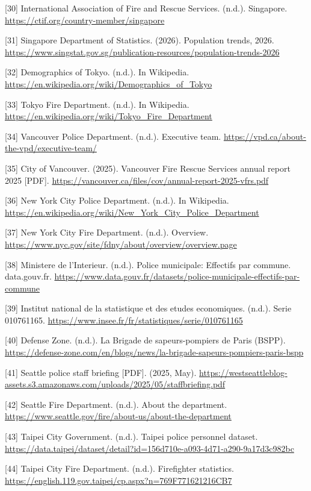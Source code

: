 \documentclass[11pt,letterpaper]{article}
\begin{document}
[30] International Association of Fire and Rescue Services. (n.d.). Singapore. \url{https://ctif.org/country-member/singapore}


[31] Singapore Department of Statistics. (2026). Population trends, 2026. \url{https://www.singstat.gov.sg/publication-resources/population-trends-2026}


[32] Demographics of Tokyo. (n.d.). In Wikipedia. \url{https://en.wikipedia.org/wiki/Demographics_of_Tokyo}


[33] Tokyo Fire Department. (n.d.). In Wikipedia. \url{https://en.wikipedia.org/wiki/Tokyo_Fire_Department}


[34] Vancouver Police Department. (n.d.). Executive team. \url{https://vpd.ca/about-the-vpd/executive-team/}


[35] City of Vancouver. (2025). Vancouver Fire Rescue Services annual report 2025 [PDF]. 
\url{https://vancouver.ca/files/cov/annual-report-2025-vfrs.pdf}


[36] New York City Police Department. (n.d.). In Wikipedia. \url{https://en.wikipedia.org/wiki/New_York_City_Police_Department}


[37] New York City Fire Department. (n.d.). Overview. \url{https://www.nyc.gov/site/fdny/about/overview/overview.page}


[38] Ministere de l'Interieur. (n.d.). Police municipale: Effectifs par commune. data.gouv.fr. 
\url{https://www.data.gouv.fr/datasets/police-municipale-effectifs-par-commune}


[39] Institut national de la statistique et des etudes economiques. (n.d.). Serie 010761165. \url{https://www.insee.fr/fr/statistiques/serie/010761165}


[40] Defense Zone. (n.d.). La Brigade de sapeurs-pompiers de Paris (BSPP). \url{https://defense-zone.com/en/blogs/news/la-brigade-sapeurs-pompiers-paris-bspp}


[41] Seattle police staff briefing [PDF]. (2025, May). \url{https://westseattleblog-assets.s3.amazonaws.com/uploads/2025/05/staffbriefing.pdf}


[42] Seattle Fire Department. (n.d.). About the department. \url{https://www.seattle.gov/fire/about-us/about-the-department}


[43] Taipei City Government. (n.d.). Taipei police personnel dataset. \url{https://data.taipei/dataset/detail?id=156d710e-a093-4d71-a290-9a17d3c982bc}


[44] Taipei City Fire Department. (n.d.). Firefighter statistics. \url{https://english.119.gov.taipei/cp.aspx?n=769F771621216CB7}
\end{document}
